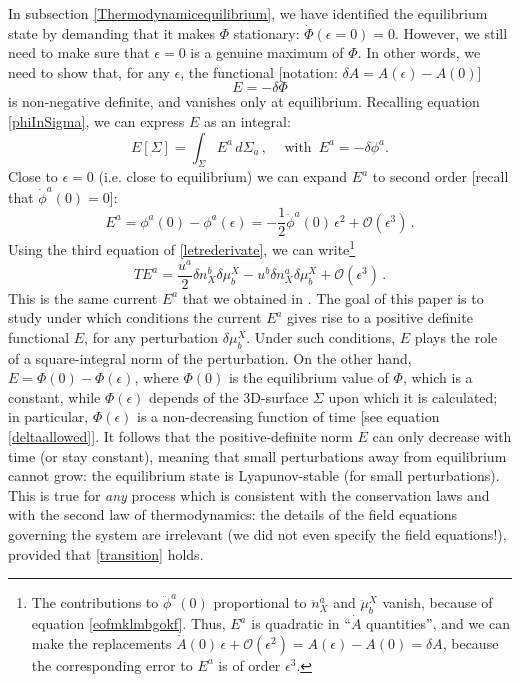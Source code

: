 \documentclass[a4paper, amsfonts, amssymb, amsmath, reprint, showkeys, nofootinbib, twoside, onecolumn,notitlepage]{revtex4-1}
\theoremstyle{definition}
\theoremstyle{theorem}
\begin{document}
In subsection \ref{Thermodynamicequilibrium}, we have identified the equilibrium state by demanding that it makes $\Phi$ stationary: $\dot{\Phi}(\epsilon=0)=0$. However, we still need to make sure that $\epsilon=0$ is a genuine maximum of $\Phi$. In other words, we need to show that, for any $\epsilon$, the functional [notation: $\delta A = A(\epsilon)-A(0)$]
\begin{equation}\label{Emenodeltaphi}
E = -\delta \Phi  
\end{equation}
is non-negative definite, and vanishes only at equilibrium. Recalling equation \eqref{phiInSigma}, we can express $E$ as an integral:
\begin{equation}\label{edsigma}
E[\Sigma]=\int_\Sigma E^a \, d\Sigma_a \, , \, \quad \text{with } \,  E^a=-\delta \phi^a.
\end{equation} 
Close to $\epsilon=0$ (i.e. close to equilibrium) we can expand $E^a$ to second order [recall that $\dot{\phi}^a(0)=0$]:
\begin{equation}
E^a =\phi^a(0)-\phi^a(\epsilon)= -\dfrac{1}{2} \ddot{\phi}^a(0) \, \epsilon^2 + \mathcal{O}(\epsilon^3) \, .
\end{equation}
Using the third equation of \eqref{letrederivate}, we can write\footnote{The contributions to $\ddot{\phi}^a(0)$ proportional to $\ddot{n}_X^a$ and $\ddot{\mu}^X_b$ vanish, because of equation \eqref{eofmklmbgokf}. Thus, $E^a$ is quadratic in ``$\dot{A}$ quantities'', and we can make the replacements $ \dot{A}(0) \, \epsilon + \mathcal{O}(\epsilon^2) = A(\epsilon)-A(0)=\delta A$, because the corresponding error to $E^a$ is of order $\epsilon^3$.}
\begin{equation}\label{proptioTE}
TE^a = \dfrac{u^a}{2} \delta n_X^b \delta \mu^X_b - u^b \delta n_X^a \delta \mu^X_b + \mathcal{O}(\epsilon^3) \, .
\end{equation}
This is the same current $E^a$ that we obtained in \cite{GavassinoGibbs2021}. The goal of this paper is to study under which conditions the current $E^a$ gives rise to a positive definite functional $E$, for any perturbation $\delta \mu^X_b$. Under such conditions, $E$ plays the role of a square-integral norm of the perturbation. On the other hand, $E=\Phi(0)-\Phi(\epsilon)$, where $\Phi(0)$ is the equilibrium value of $\Phi$, which is a constant, while $\Phi(\epsilon)$ depends of the 3D-surface $\Sigma$ upon which it is calculated; in particular, $\Phi(\epsilon)$ is a non-decreasing function of time [see equation \eqref{deltaallowed}]. It follows that the positive-definite norm $E$ can only decrease with time (or stay constant), meaning that small perturbations away from equilibrium cannot grow: the equilibrium state is Lyapunov-stable (for small perturbations). This is true for \textit{any} process which is consistent with the conservation laws and with the second law of thermodynamics: the details of the field equations governing the system are irrelevant (we did not even specify the field equations!), provided that \eqref{transition} holds. 
\end{document}
